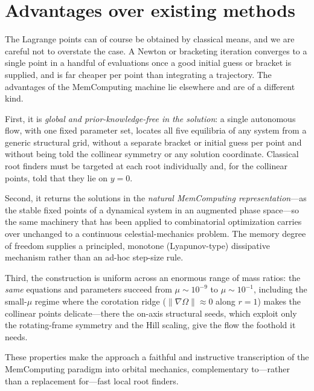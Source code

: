 \documentclass[aip,preprint,amsmath,amssymb,floatfix]{revtex4-2}
\begin{document}
\section{Advantages over existing methods}\label{sec:advantages}

The Lagrange points can of course be obtained by classical means, and we are
careful not to overstate the case. A Newton or bracketing iteration converges to a
single point in a handful of evaluations once a good initial guess or bracket is
supplied, and is far cheaper per point than integrating a trajectory. The
advantages of the MemComputing machine lie elsewhere and are of a different kind.

First, it is \emph{global and prior-knowledge-free in the solution}: a single
autonomous flow, with one fixed parameter set, locates all five equilibria of any
system from a generic structural grid, without a separate bracket or initial guess
per point and without being told the collinear symmetry or any solution
coordinate. Classical root finders must be targeted at each root individually and,
for the collinear points, told that they lie on $y=0$.

Second, it returns the solutions in the \emph{natural MemComputing
representation}---as the stable fixed points of a dynamical system in an augmented
phase space---so the same machinery that has been applied to combinatorial
optimization carries over unchanged to a continuous celestial-mechanics problem.
The memory degree of freedom supplies a principled, monotone (Lyapunov-type)
dissipative mechanism rather than an ad-hoc step-size rule.

Third, the construction is uniform across an enormous range of mass ratios: the
\emph{same} equations and parameters succeed from $\mu\sim10^{-9}$ to
$\mu\sim10^{-1}$, including the small-$\mu$ regime where the corotation ridge
($\lVert\nabla\Omega\rVert\approx0$ along $r=1$) makes the collinear points
delicate---there the on-axis structural seeds, which exploit only the
rotating-frame symmetry and the Hill scaling, give the flow the foothold it needs.

These properties make the approach a faithful and instructive transcription of the
MemComputing paradigm into orbital mechanics, complementary to---rather than a
replacement for---fast local root finders.

\end{document}
